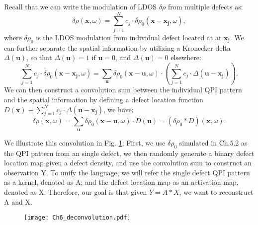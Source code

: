 \par \noindent Recall that we can write the modulation of \ac{LDOS} $\delta \rho$ from multiple defects as:
\begin{equation}
	\delta \rho(\mathbf{x}, \omega) = \sum_{j=1}^{N}c_j \cdot \delta \rho_0(\mathbf{x}-\mathbf{x_j},\omega),
\end{equation}
\noindent where $\delta \rho_0$ is the \ac{LDOS} modulation from individual defect located at at $\mathbf{x_j}$. We can further separate the spatial information by utilizing a Kronecker delta $\Delta(\mathbf{u})$, so that $\Delta(\mathbf{u})=1$ if $\mathbf{u} = 0$, and $\Delta(\mathbf{u})=0$ elsewhere: 
\begin{equation}
	\sum_{j=1}^{N}c_j \cdot \delta \rho_0(\mathbf{x}-\mathbf{x_j},\omega) = \sum_{\mathbf{u}} \delta \rho_0(\mathbf{x}-\mathbf{u},\omega)\cdot(\sum_{j=1}^{N} c_j \cdot \Delta(\mathbf{u-x_j})).
\end{equation}
\noindent We can then construct a convolution sum between the individual \ac{QPI} pattern and the spatial information by defining a defect location function $D(\mathbf{x}) \equiv \sum_{j=1}^{N} c_j \cdot \Delta(\mathbf{u-x_j})$, we have: 
\begin{equation}
	\delta \rho(\mathbf{x}, \omega) =  \sum_{\mathbf{u}} \delta \rho_0(\mathbf{x}-\mathbf{u},\omega)\cdot D(\mathbf{u}) = (\delta \rho_0 *D)(\mathbf{x}, \omega).
\end{equation}

We illustrate this convolution in Fig. \ref{fig:ch6_decon}; First, we use $\delta \rho_0$ simulated in Ch.5.2 as the \ac{QPI} pattern from an single defect, we then randomly generate a binary defect location map given a defect density, and use the convolution sum to construct an observation Y. To unify the language, we will refer the single defect \ac{QPI} pattern as a kernel, denoted as A; and the defect location map as an activation map, denoted as X. Therefore, our goal is that given $Y = A * X$, we want to reconstruct A and X. 

\begin{figure}
	\texttt{[image: Ch6\_deconvolution.pdf]} 
	\centering
	\caption{}
	\label{fig:ch6_decon}
\end{figure}


